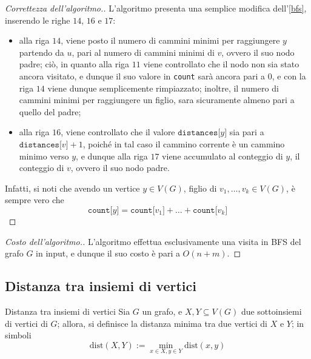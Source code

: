 \documentclass[a4paper, 12pt]{report}
\begin{document}
    \begin{proof}[Correttezza dell'algoritmo.]
        L'algoritmo presenta una semplice modifica dell'\cref{bfs}, inserendo le righe $14$, $16$ e $17$:

        \begin{itemize}
            \item alla riga $14$, viene posto il numero di cammini minimi per raggiungere $y$ partendo da $u$, pari al numero di cammini minimi di $v$, ovvero il suo nodo padre; ciò, in quanto alla riga $11$ viene controllato che il nodo non sia stato ancora visitato, e dunque il suo valore in \texttt{count} sarà ancora pari a $0$, e con la riga $14$ viene dunque semplicemente rimpiazzato; inoltre, il numero di cammini minimi per raggiungere un figlio, sara sicuramente almeno pari a quello del padre;
            \item alla riga $16$, viene controllato che il valore $\texttt{distances[}y\texttt{]}$ sia pari a $\texttt{distances[}v\texttt{]} + 1$, poiché in tal caso il cammino corrente è un cammino minimo verso $y$, e dunque alla riga $17$ viene accumulato al conteggio di $y$, il conteggio di $v$, ovvero il suo nodo padre.
        \end{itemize}

        Infatti, si noti che avendo un vertice $y \in V(G)$, figlio di $v_1, \ldots, v_k \in V(G)$, è sempre vero che $$\texttt{count[}y\texttt{]} = \texttt{count[}v_1\texttt{]} + \ldots + \texttt{count[}v_k\texttt{]}$$
    \end{proof}

    \begin{proof}[Costo dell'algoritmo.]
        L'algoritmo effettua esclusivamente una visita in BFS del grafo $G$ in input, e dunque il suo costo è pari a $O(n+m)$.
    \end{proof}

    \subsection{Distanza tra insiemi di vertici}

    \begin{frameddefn}{Distanza tra insiemi di vertici}
        Sia $G$ un grafo, e $X, Y \subseteq V(G)$ due sottoinsiemi di vertici di $G$; allora, si definisce  la distanza minima tra due vertici di $X$ e $Y$; in simboli $$\mathrm{dist}(X, Y) := \min_{x \in X, y \in Y}{\mathrm{dist}(x, y)}$$
    \end{frameddefn}
\end{document}
